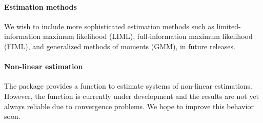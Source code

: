 \paragraph{Estimation methods}
We wish to include more sophisticated estimation methods such
as limited-information maximum likelihood (LIML),
full-information maximum likelihood (FIML),
and generalized methods of moments (GMM), in future releases.

\paragraph{Non-linear estimation}
The  package provides a function to estimate
systems of non-linear estimations.
However, the function  is currently under development
and the results are not yet always reliable
due to convergence problems.
We hope to improve this behavior soon.






